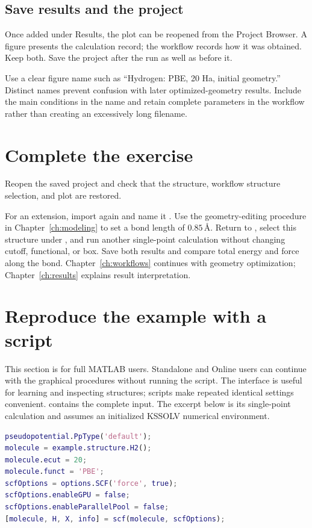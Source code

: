 \subsection{Save results and the project}

Once added under Results, the plot can be reopened from the Project Browser. A figure presents the calculation record; the workflow records how it was obtained. Keep both. Save the project after the run as well as before it.

Use a clear figure name such as ``Hydrogen: PBE, 20 Ha, initial geometry.'' Distinct names prevent confusion with later optimized-geometry results. Include the main conditions in the name and retain complete parameters in the workflow rather than creating an excessively long filename.

\section{Complete the exercise}

Reopen the saved project and check that the structure, workflow structure selection, and plot are restored.

For an extension, import  again and name it . Use the geometry-editing procedure in Chapter~\ref{ch:modeling} to set a bond length of $0.85\,\text{\AA}$. Return to , select this structure under , and run another single-point calculation without changing cutoff, functional, or box. Save both results and compare total energy and force along the bond. Chapter~\ref{ch:workflows} continues with geometry optimization; Chapter~\ref{ch:results} explains result interpretation.

\section{Reproduce the example with a script}

This section is for full MATLAB\regmark{} users. Standalone and Online users can continue with the graphical procedures without running the script. The interface is useful for learning and inspecting structures; scripts make repeated identical settings convenient.  contains the complete input. The excerpt below is its single-point calculation and assumes an initialized KSSOLV numerical environment.

\begin{lstlisting}[language=Matlab]
pseudopotential.PpType('default');
molecule = example.structure.H2();
molecule.ecut = 20;
molecule.funct = 'PBE';
scfOptions = options.SCF('force', true);
scfOptions.enableGPU = false;
scfOptions.enableParallelPool = false;
[molecule, H, X, info] = scf(molecule, scfOptions);
\end{lstlisting}


